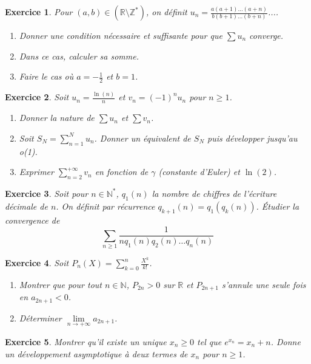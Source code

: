 \documentclass[12pt]{article}
\newtheorem{exercise}{Exercice}[section]
\theoremstyle{remark}
\theoremstyle{remark}
\newcommand{\R}{\mathbb{R}}
\newcommand{\N}{\mathbb{N}}
\newcommand{\Z}{\mathbb{Z}}
\begin{document}
\begin{exercise}
	Pour $(a,b)\in(\R\setminus\Z^{*})$, on définit
	$u_{n}=\frac{a(a+1)\dots(a+n)}{b(b+1)\dots(b+n)}$....
	\begin{enumerate}
		\item Donner une condition nécessaire et suffisante pour que $\sum
		u_{n}$ converge.
		\item Dans ce cas, calculer sa somme.
		\item Faire le cas où $a=-\frac{1}{2}$ et $b=1$.
	\end{enumerate}
\end{exercise}

\begin{exercise}
	Soit $u_{n}=\frac{\ln(n)}{n}$ et $v_{n}=(-1)^{n}u_{n}$ pour $n\geqslant1$.
	\begin{enumerate}
		\item Donner la nature de $\sum u_{n}$ et $\sum v_{n}$.
		\item Soit $S_{N}=\sum_{n=1}^{N}u_{n}$. Donner un équivalent de $S_{N}$
		puis développer jusqu'au o(1).
		\item Exprimer $\sum_{n=2}^{+\infty}v_{n}$ en fonction de $\gamma$
		(constante d'Euler) et $\ln(2)$.
	\end{enumerate}
\end{exercise}

\begin{exercise}
	Soit pour $n\in\N^{*}$, $q_{1}(n)$ la nombre de chiffres de l'écriture
	décimale de $n$. On définit par récurrence $q_{k+1}(n)=q_{1}(q_{k}(n))$.
	Étudier la convergence de 
	$$\sum_{n\geqslant1}\frac{1}{nq_{1}(n)q_{2}(n)\dots q_{n}(n)}$$
\end{exercise}

\begin{exercise}
	Soit $P_{n}(X)=\sum_{k=0}^{n}\frac{X^{k}}{k!}$.
	\begin{enumerate}
		\item Montrer que pour tout $n\in\N$, $P_{2n}>0$ sur $\R$ et $P_{2n+1}$
		s'annule une seule fois en $a_{2n+1}<0$.
		\item Déterminer $\lim\limits_{n\to+\infty}a_{2n+1}$.
	\end{enumerate}
\end{exercise}

\begin{exercise}
	Montrer qu'il existe un unique $x_{n}\geqslant0$ tel que
	$e^{x_{n}}=x_{n}+n$. Donne un développement asymptotique à deux termes de
	$x_{n}$ pour $n\geqslant1$.
\end{exercise}
\end{document}
